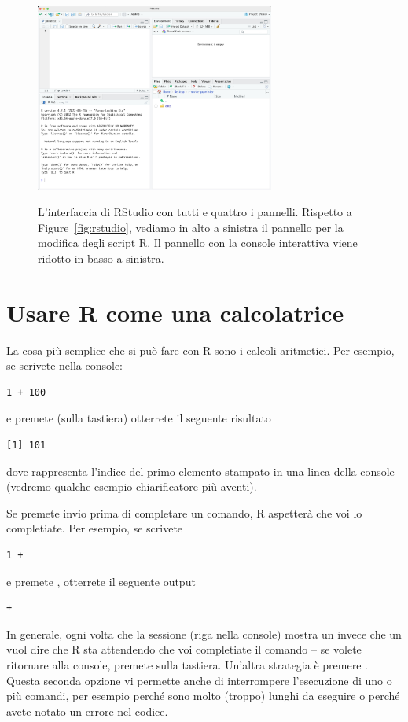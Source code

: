 \begin{figure}[h!]
 \centering
  \includegraphics[width=0.7\textwidth]{images/01-rstudio-script.png}
   \label{fig:rstudio-script}
 \caption{L'interfaccia di RStudio con tutti e quattro i pannelli. Rispetto a Figure~\ref{fig:rstudio}, vediamo in alto a sinistra il pannello per la modifica degli script R. Il pannello con la console interattiva viene ridotto in basso a sinistra.}
\end{figure}


\section{Usare R come una calcolatrice}

La cosa pi\`u semplice che si pu\`o fare con R sono i calcoli aritmetici. Per esempio, se scrivete nella console:

\begin{lstlisting}[style=Rstyle]
1 + 100
\end{lstlisting}
%
e premete  (sulla tastiera) otterrete il seguente risultato

\begin{lstlisting}[style=Rstyle]
[1] 101
\end{lstlisting}
%
dove \lsin{[1]} rappresenta l'indice del primo elemento stampato in una linea della console (vedremo qualche esempio chiarificatore pi\`u aventi). 

\noindent
Se premete invio prima di completare un comando, R aspetter\`a che voi lo completiate. Per esempio, se scrivete

\begin{lstlisting}[style=Rstyle]
1 + 
\end{lstlisting}
%
e premete , otterrete il seguente output

\begin{lstlisting}[style=Rstyle]
+ 
\end{lstlisting}
%
In generale, ogni volta che la sessione (riga nella console) mostra un \lsin{+} invece che un \lsin{>} vuol dire che R sta attendendo che voi completiate il comando -- se volete ritornare alla console, premete  sulla tastiera. Un'altra strategia \`e premere . Questa seconda opzione vi permette anche di interrompere l'esecuzione di uno o pi\`u comandi, per esempio perch\'e sono molto (troppo) lunghi da eseguire o perch\'e  avete notato un errore nel codice. 


